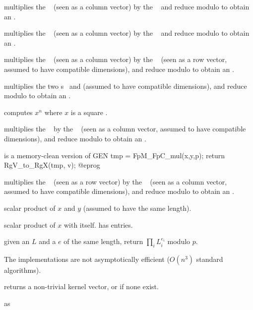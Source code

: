  multiplies the ~
(seen as a column vector) by the ~ and reduce modulo  to
obtain an .

 multiplies the ~
(seen as a column vector) by the ~ and reduce modulo  to
obtain an .

 multiplies the ~
(seen as a column vector) by the ~ (seen as a row vector,
assumed to have compatible dimensions), and reduce modulo  to obtain
an .

 multiplies the two s~
and  (assumed to have compatible dimensions), and reduce modulo
 to obtain an .

 computes $x^n$ where $x$ is a
square .

 multiplies the ~
by the ~ (seen as a column vector, assumed to have compatible
dimensions), and reduce modulo  to obtain an .

 is a memory-clean
version of
\bprog
  GEN tmp = FpM_FpC_mul(x,y,p);
  return RgV_to_RgX(tmp, v);
@eprog

 multiplies the ~
(seen as a row vector) by the ~ (seen as a column vector,
assumed to have compatible dimensions), and reduce modulo  to obtain
an .

 scalar product of
$x$ and $y$ (assumed to have the same length).

 scalar product of $x$ with itself.
has  entries.

 given an  $L$
and a  $e$ of the same length, return $\prod_i L_i^{e_i}$ modulo $p$.

 The implementations are not
asymptotically efficient ($O(n^3)$ standard algorithms).

 returns a non-trivial kernel vector,
or  if none exist.

 as 

